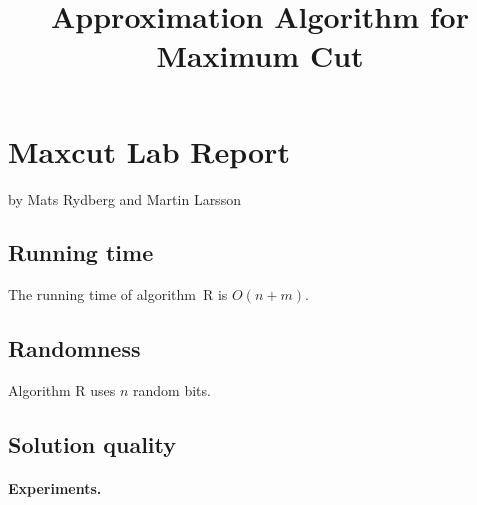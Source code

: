 \documentclass{tufte-handout}
\title{\sf Approximation Algorithm for Maximum Cut}
\begin{document}
\newpage
\section{Maxcut Lab Report}


by Mats Rydberg and Martin Larsson

\subsection{Running time}

The running time of algorithm~R is $O(n+m)$.

\subsection{Randomness}

Algorithm R uses $n$ random bits.

\subsection{Solution quality}

\paragraph{Experiments.}
\end{document}
